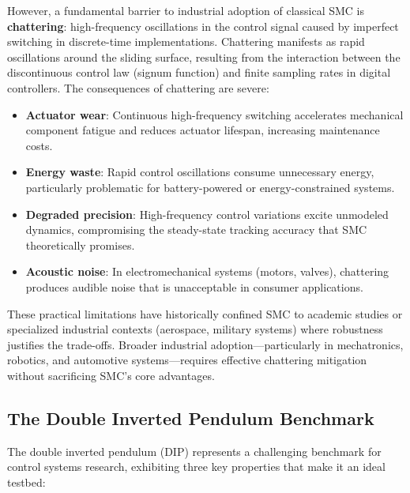 However, a fundamental barrier to industrial adoption of classical SMC is \textbf{chattering}: high-frequency oscillations in the control signal caused by imperfect switching in discrete-time implementations. Chattering manifests as rapid oscillations around the sliding surface, resulting from the interaction between the discontinuous control law (signum function) and finite sampling rates in digital controllers. The consequences of chattering are severe:

\begin{itemize}
    \item \textbf{Actuator wear}: Continuous high-frequency switching accelerates mechanical component fatigue and reduces actuator lifespan, increasing maintenance costs.
    \item \textbf{Energy waste}: Rapid control oscillations consume unnecessary energy, particularly problematic for battery-powered or energy-constrained systems.
    \item \textbf{Degraded precision}: High-frequency control variations excite unmodeled dynamics, compromising the steady-state tracking accuracy that SMC theoretically promises.
    \item \textbf{Acoustic noise}: In electromechanical systems (motors, valves), chattering produces audible noise that is unacceptable in consumer applications.
\end{itemize}

These practical limitations have historically confined SMC to academic studies or specialized industrial contexts (aerospace, military systems) where robustness justifies the trade-offs. Broader industrial adoption—particularly in mechatronics, robotics, and automotive systems—requires effective chattering mitigation without sacrificing SMC's core advantages.

\subsection{The Double Inverted Pendulum Benchmark}

The double inverted pendulum (DIP) represents a challenging benchmark for control systems research, exhibiting three key properties that make it an ideal testbed:

